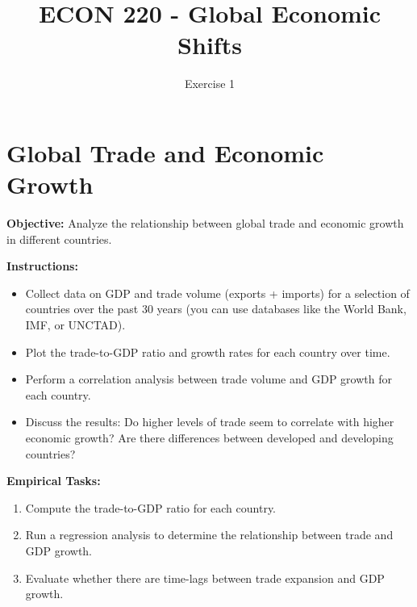 \documentclass{article}
\title{ECON 220 - Global Economic Shifts}
\author{Exercise 1}
\date{}
\begin{document}
\maketitle

\section*{Global Trade and Economic Growth}
\textbf{Objective:} Analyze the relationship between global trade and economic growth in different countries.

\textbf{Instructions:}
\begin{itemize}
    \item Collect data on GDP and trade volume (exports + imports) for a selection of countries over the past 30 years (you can use databases like the World Bank, IMF, or UNCTAD).
    \item Plot the trade-to-GDP ratio and growth rates for each country over time.
    \item Perform a correlation analysis between trade volume and GDP growth for each country.
    \item Discuss the results: Do higher levels of trade seem to correlate with higher economic growth? Are there differences between developed and developing countries?
\end{itemize}

\textbf{Empirical Tasks:}
\begin{enumerate}
    \item Compute the trade-to-GDP ratio for each country.
    \item Run a regression analysis to determine the relationship between trade and GDP growth.
    \item Evaluate whether there are time-lags between trade expansion and GDP growth.
\end{enumerate}
\end{document}
